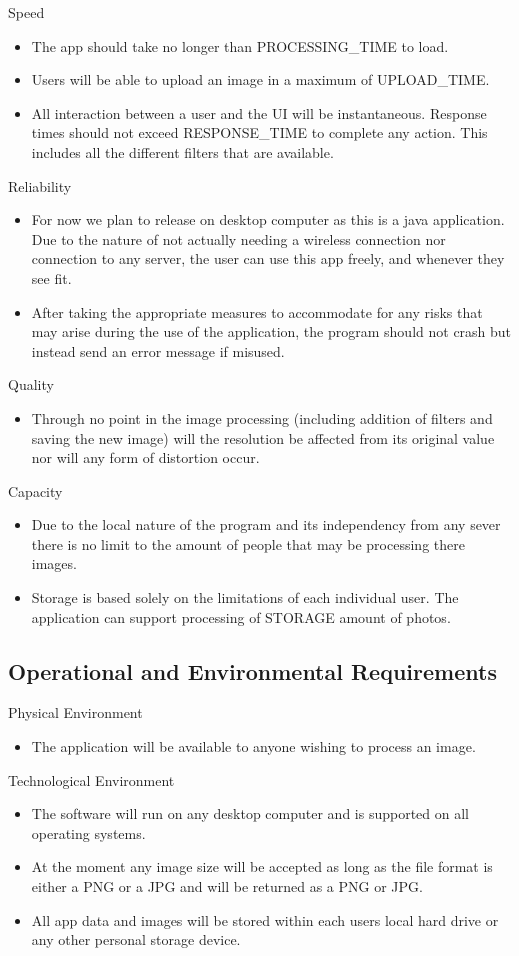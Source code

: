 \documentclass[12pt, titlepage]{article}
\begin{document}
Speed
\begin{itemize}
\item The app should take no longer than PROCESSING\_TIME to load.
\item Users will be able to upload an image in a maximum of UPLOAD\_TIME.
\item All interaction between a user and the UI will be instantaneous. Response times should not exceed RESPONSE\_TIME to complete any action. This includes all the different filters that are available.
\end{itemize}
Reliability
\begin{itemize}
\item For now we plan to release on desktop computer as this is a java application. Due to the nature of not actually needing a wireless connection nor connection to any server, the user can use this app freely, and whenever they see fit.
\item After taking the appropriate measures to accommodate for any risks that may arise during the use of the application, the program should not crash but instead send an error message if misused.
\end{itemize}
Quality
\begin{itemize}
\item Through no point in the image processing (including addition of filters and saving the new image) will the resolution be affected from its original value nor will any form of distortion occur.
\end{itemize}
Capacity
\begin{itemize}
\item Due to the local nature of the program and its independency from any sever there is no limit to the amount of people that may be processing there images.
\item Storage is based solely on the limitations of each individual user. The application can support processing of STORAGE amount of photos.
\end{itemize}


\subsection{Operational and Environmental Requirements}

Physical Environment
\begin{itemize}
\item The application will be available to anyone wishing to process an image.
\end{itemize}
Technological Environment
\begin{itemize}
\item The software will run on any desktop computer and is supported on all operating systems.
\item At the moment any image size will be accepted as long as the file format is either a PNG or a JPG and will be returned as a PNG or JPG.
\item All app data and images will be stored within each users local hard drive or any other personal storage device.
\end{itemize}
\end{document}
